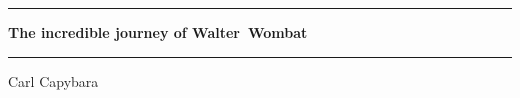 \documentclass{article}
\begin{document}
\begin{center}
	\setlength{\parskip}{2ex}
\rule{\textwidth}{.4pt}\par
{\huge\bfseries The incredible journey of Walter~Wombat \par}
\rule{\textwidth}{.4pt}\par
\bigbreak
{\Large Carl Capybara\par}
\end{center}
\end{document}
